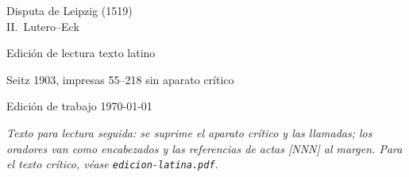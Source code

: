\documentclass[11pt,a4paper,twoside]{article}
\begin{document}
\begin{titlepage}
\centering
{\LARGE Disputa de Leipzig (1519)\\II.\ Lutero--Eck\par}
\vspace{1em}
{\large Edici\'on de lectura \textperiodcentered{} texto latino\par}
\vspace{2em}
{\normalsize Seitz 1903, impresas 55--218 \textperiodcentered{} sin aparato cr\'itico\par}
\vfill
{\small Edici\'on de trabajo \textperiodcentered{} \today\par}
\end{titlepage}
\noindent\textit{Texto para lectura seguida: se suprime el aparato cr\'itico y las llamadas; los oradores van como encabezados y las referencias de actas [NNN] al margen. Para el texto cr\'itico, v\'ease \texttt{edicion-latina.pdf}.}

\bigskip



\end{document}
